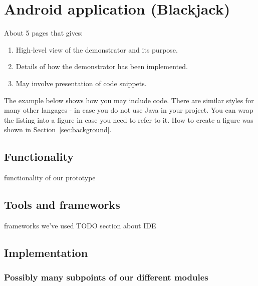 \section{Android application (Blackjack)}
\label{sec:prototype}

About 5 pages that gives:

\begin{enumerate}
  
\item High-level view of the demonstrator and its purpose.

\item Details of how the demonstrator has been implemented.

\item May involve presentation of code snippets.

\end{enumerate}

The example below shows how you may include code. There are similar
styles for many other langages - in case you do not use Java in your
project. You can wrap the listing into a figure in case you need to
refer to it. How to create a figure was shown in Section~\ref{sec:background}.
  


\subsection{Functionality}
functionality of our prototype
 
\subsection{Tools and frameworks}
frameworks we've used
TODO section about IDE
\subsection{Implementation}
\subsubsection{Possibly many subpoints of our different modules}
